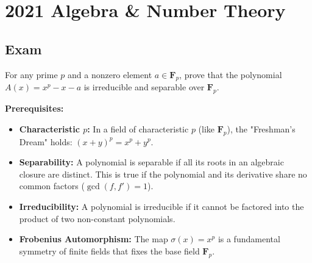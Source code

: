 \section{2021 Algebra \& Number Theory}

\subsection*{Exam}
\begin{exercise}
\label{algebra:2021:1}
For any prime $p$ and a nonzero element $a \in \mathbf{F}_p$, prove that the polynomial $A(x) = x^p - x - a$ is irreducible and separable over $\mathbf{F}_p$.
\end{exercise}

\begin{solution}
\textbf{Prerequisites:}
\begin{itemize}
    \item \textbf{Characteristic $p$:} In a field of characteristic $p$ (like $\mathbf{F}_p$), the "Freshman's Dream" holds: $(x+y)^p = x^p + y^p$.
    \item \textbf{Separability:} A polynomial is separable if all its roots in an algebraic closure are distinct. This is true if the polynomial and its derivative share no common factors ($\gcd(f, f') = 1$).
    \item \textbf{Irreducibility:} A polynomial is irreducible if it cannot be factored into the product of two non-constant polynomials.
    \item \textbf{Frobenius Automorphism:} The map $\sigma(x) = x^p$ is a fundamental symmetry of finite fields that fixes the base field $\mathbf{F}_p$.
\end{itemize}


\end{solution}
